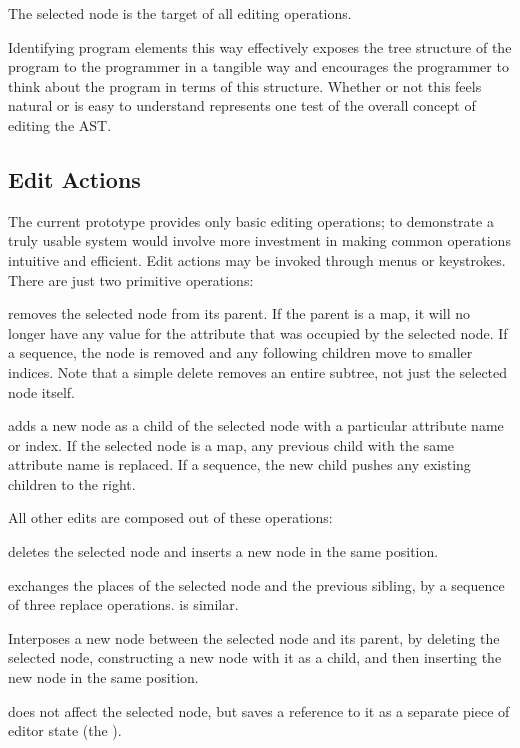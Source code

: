 The selected node is the target of all editing operations.

Identifying program elements this way effectively exposes the tree structure of the program to the programmer in a tangible way and encourages the programmer to think about the program in terms of this structure. Whether or not this feels natural or is easy to understand represents one test of the overall concept of editing the AST.


\subsection{Edit Actions}
The current prototype provides only basic editing operations; to demonstrate a truly usable system would involve more investment in making common operations intuitive and efficient. Edit actions may be invoked through menus or keystrokes. There are just two primitive operations:

 removes the selected node from its parent. If the parent is a map, it will no longer have any value for the attribute that was occupied by the selected node. If a sequence, the node is removed and any following children move to smaller indices. Note that a simple delete removes an entire subtree, not just the selected node itself.

 adds a new node as a child of the selected node with a particular attribute name or index. If the selected node is a map, any previous child with the same attribute name is replaced. If a sequence, the new child pushes any existing children to the right.

All other edits are composed out of these operations:

 deletes the selected node and inserts a new node in the same position.

 exchanges the places of the selected node and the previous sibling, by a sequence of three replace operations.  is similar.

 Interposes a new node between the selected node and its parent, by deleting the selected node, constructing a new node with it as a child, and then inserting the new node in the same position.



 does not affect the selected node, but saves a reference to it as a separate piece of editor state (the ).

